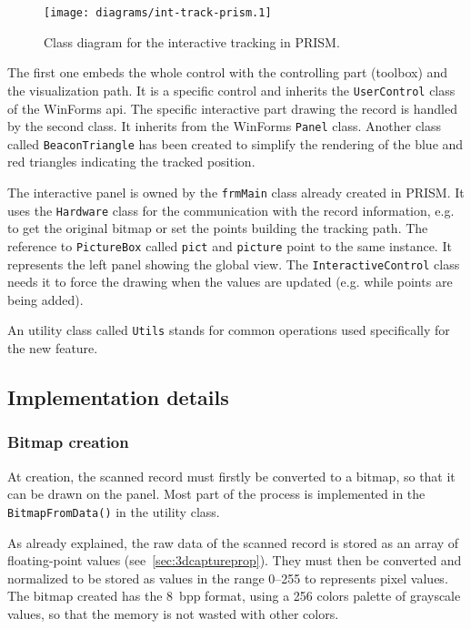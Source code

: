 \begin{figure}[!ht]
\centering
\texttt{[image: diagrams/int-track-prism.1]}
\caption{Class diagram for the interactive tracking in PRISM.}
\label{fig:inttrackprismdiag}
\end{figure}

The first one embeds the whole control with the controlling part (toolbox) and the visualization path. It is a specific control and inherits the \texttt{UserControl} class of the WinForms \gls{api}. The specific interactive part drawing the record is handled by the second class. It inherits from the WinForms \texttt{Panel} class. Another class called \texttt{BeaconTriangle} has been created to simplify the rendering of the blue and red triangles indicating the tracked position.

The interactive panel is owned by the \texttt{frmMain} class already created in PRISM. It uses the \texttt{Hardware} class for the communication with the record information, e.g. to get the original bitmap or set the points building the tracking path. The reference to \texttt{PictureBox} called \texttt{pict} and \texttt{picture} point to the same instance. It represents the left panel showing the global view. The \texttt{InteractiveControl} class needs it to force the drawing when the values are updated (e.g. while points are being added).

An utility class called \texttt{Utils} stands for common operations used specifically for the new feature.

\subsection{Implementation details}

\subsubsection{Bitmap creation}

At creation, the scanned record must firstly be converted to a bitmap, so that it can be drawn on the panel. Most part of the process is implemented in the \texttt{BitmapFromData()} in the utility class.

As already explained, the raw data of the scanned record is stored as an array of floating-point values (see~\autoref{sec:3dcaptureprop}). They must then be converted and normalized to be stored as values in the range \numrange[range-phrase=--]{0}{255} to represents pixel values. The bitmap created has the \SI{8}{bpp} format, using a 256 colors palette of grayscale values, so that the memory is not wasted with other colors.

